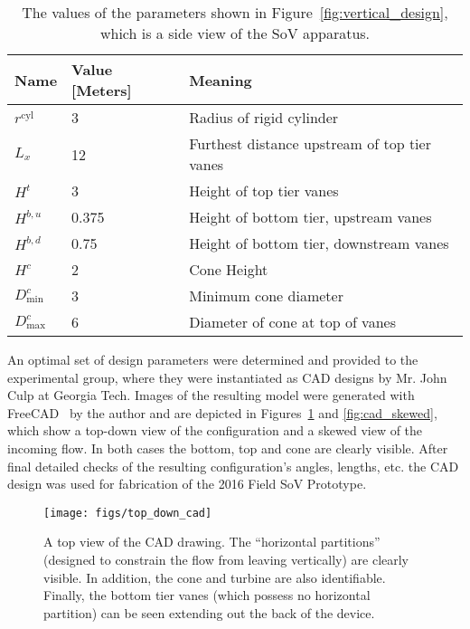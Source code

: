 \begin{table}[]
 \caption{The values of the parameters shown in
 Figure~\ref{fig:vertical_design}, which is a side view of the SoV
 apparatus.} 
\centering
\begin{tabular}{l|l|l}
Name                        & Value [Meters] & Meaning                    \\
 \hline
$r^{\text{cyl}}$            &   3   & Radius of rigid cylinder \\
$L_x$                       &  12   & Furthest distance upstream of top	 tier vanes \\
 $H^t    $                  &   3   & Height of top tier vanes \\
 $H^{b,u}$                  & 0.375 & Height of bottom tier, upstream vanes \\
 $H^{b,d}$                  & 0.75  & Height of bottom tier, downstream vanes \\
 $H^{c}$                    &   2   & Cone Height \\
 $D^c_{\text{min}}    $     &   3   & Minimum cone diameter \\
 $D^c_{\text{max}}    $     &   6   & Diameter of cone at top of vanes\\
\end{tabular}
 \label{tab:side}
\end{table}

An optimal set of design parameters were determined and provided to the
experimental group, where they were instantiated as CAD designs by
Mr. John Culp at Georgia Tech. Images of the resulting model were generated
with FreeCAD~\cite{Falck} by the author and are
depicted in Figures~\ref{fig:top_down_cad} and \ref{fig:cad_skewed},
which show a top-down view of the configuration and a skewed
view of the incoming flow. In both cases the bottom, top and cone are
clearly visible. After final detailed checks of the resulting
configuration's angles, lengths, etc. the CAD design was used for
fabrication of the 2016 Field SoV Prototype. 

\begin{figure}[!htb]
  \begin{center}
   \texttt{[image: figs/top\_down\_cad]}
   \caption{A top view of the CAD drawing. The ``horizontal partitions''
   (designed to constrain the flow from leaving vertically) are clearly
   visible. In addition, the cone and turbine are also
   identifiable. Finally, the bottom tier vanes (which possess no
   horizontal partition) can be seen extending out the back of the
   device.} 
   \label{fig:top_down_cad}
  \end{center}
 \end{figure}

